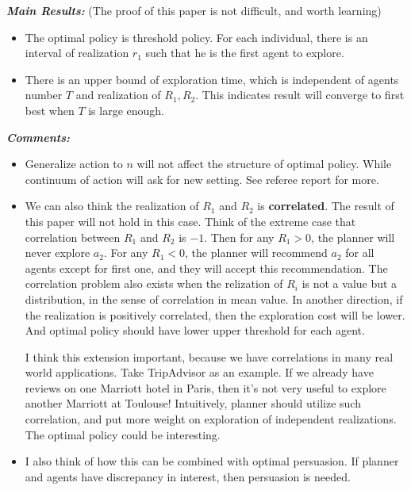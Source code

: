 \documentclass{book}
\theoremstyle{plain}
\theoremstyle{definition}
\begin{document}
\vspace{2mm}
\noindent
\textit{\textbf{Main Results:}}
(The proof of this paper is not difficult, and worth learning)
\begin{itemize}
	\item The optimal policy is threshold policy. For each individual, there is an interval of realization $r_1$ such that he is the first agent to explore.
	\item There is an upper bound of exploration time, which is independent of agents number $T$ and realization of $R_1,R_2$.
	This indicates result will converge to first best when $T$ is large enough.
\end{itemize}

\vspace{2mm}
\noindent
\textit{\textbf{Comments:}}
\begin{itemize}
	\item Generalize action to $n$ will not affect the structure of optimal policy. While continuum of action will ask for new setting. See referee report for more.

	\item We can also think the realization of $R_1$ and $R_2$ is \textbf{correlated}. 
	The result of this paper will not hold in this case.
	Think of the extreme case that correlation between $R_1$ and $R_2$ is $-1$.
	Then for any $R_1>0$, the planner will never explore $a_2$. For any $R_1<0$, the planner will recommend $a_2$ for all agents except for first one, and they will accept this recommendation.
	The correlation problem also exists when the relization of $R_i$ is not a value but a distribution, in the sense of correlation in mean value. In another direction, if the realization is positively correlated, then the exploration cost will be lower. And optimal policy should have lower upper threshold for each agent.
	\vspace{1mm}

	I think this extension important, because we have correlations in many real world applications.
	Take TripAdvisor as an example. If we already have reviews on one Marriott hotel in Paris, then it's not very useful to explore another Marriott at Toulouse! 
	Intuitively, planner should utilize such correlation, and put more weight on exploration of independent realizations.
	The optimal policy could be interesting.

	\item I also think of how this can be combined with optimal persuasion.
	If planner and agents have discrepancy in interest, 
	then persuasion is needed.
\end{itemize}
\end{document}
